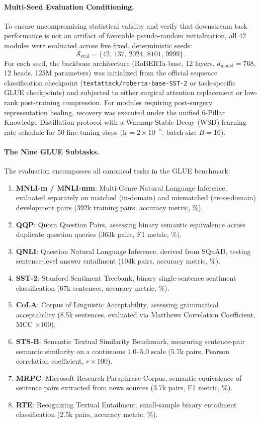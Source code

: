 \paragraph{Multi-Seed Evaluation Conditioning.}
To ensure uncompromising statistical validity and verify that downstream task performance is not an artifact of favorable pseudo-random initialization, all 42 modules were evaluated across five fixed, deterministic seeds:
\begin{equation}
\mathcal{S}_{\text{eval}} = \{42, \, 137, \, 2024, \, 8101, \, 9999\}.
\end{equation}
For each seed, the backbone architecture (RoBERTa-base, 12 layers, $d_{\text{model}}=768$, 12 heads, 125M parameters) was initialized from the official sequence classification checkpoint (\nolinkurl{textattack/roberta-base-SST-2} or task-specific GLUE checkpoints) and subjected to either surgical attention replacement or low-rank post-training compression. For modules requiring post-surgery representation healing, recovery was executed under the unified 6-Pillar Knowledge Distillation protocol with a Warmup-Stable-Decay (WSD) learning rate schedule for 50 fine-tuning steps ($\text{lr} = 2 \times 10^{-5}$, batch size $B=16$).

\paragraph{The Nine GLUE Subtasks.}
The evaluation encompasses all canonical tasks in the GLUE benchmark:
\begin{enumerate}
    \item \textbf{MNLI-m / MNLI-mm}: Multi-Genre Natural Language Inference, evaluated separately on matched (in-domain) and mismatched (cross-domain) development pairs (392k training pairs, accuracy metric, \%).
    \item \textbf{QQP}: Quora Question Pairs, assessing binary semantic equivalence across duplicate question queries (363k pairs, F1 metric, \%).
    \item \textbf{QNLI}: Question Natural Language Inference, derived from SQuAD, testing sentence-level answer entailment (104k pairs, accuracy metric, \%).
    \item \textbf{SST-2}: Stanford Sentiment Treebank, binary single-sentence sentiment classification (67k sentences, accuracy metric, \%).
    \item \textbf{CoLA}: Corpus of Linguistic Acceptability, assessing grammatical acceptability (8.5k sentences, evaluated via Matthews Correlation Coefficient, MCC $\times 100$).
    \item \textbf{STS-B}: Semantic Textual Similarity Benchmark, measuring sentence-pair semantic similarity on a continuous $1.0\text{--}5.0$ scale (5.7k pairs, Pearson correlation coefficient, $r \times 100$).
    \item \textbf{MRPC}: Microsoft Research Paraphrase Corpus, semantic equivalence of sentence pairs extracted from news sources (3.7k pairs, F1 metric, \%).
    \item \textbf{RTE}: Recognizing Textual Entailment, small-sample binary entailment classification (2.5k pairs, accuracy metric, \%).
\end{enumerate}

